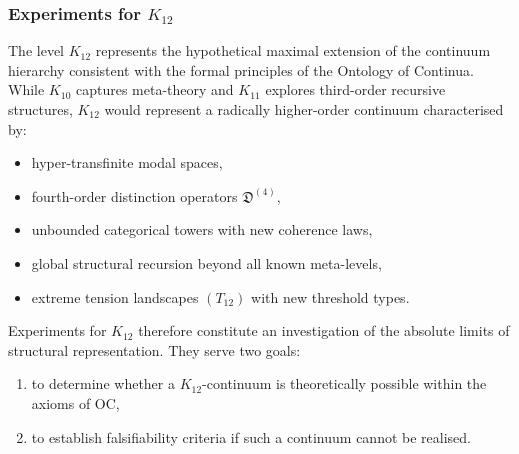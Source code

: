 
\subsubsection{Experiments for $K_{12}$}
\label{sec:experiments-k12}

The level $K_{12}$ represents the hypothetical maximal extension of 
the continuum hierarchy consistent with the formal principles of the 
Ontology of Continua.  
While $K_{10}$ captures meta-theory and $K_{11}$ explores 
third-order recursive structures, $K_{12}$ would represent a 
radically higher-order continuum characterised by:

\begin{itemize}
    \item hyper-transfinite modal spaces,
    \item fourth-order distinction operators $\mathfrak{D}^{(4)}$,
    \item unbounded categorical towers with new coherence laws,
    \item global structural recursion beyond all known meta-levels,
    \item extreme tension landscapes $(T_{12})$ with new threshold types.
\end{itemize}

Experiments for $K_{12}$ therefore constitute an investigation of the 
absolute limits of structural representation.  
They serve two goals:

\begin{enumerate}
    \item to determine whether a $K_{12}$-continuum is theoretically 
          possible within the axioms of OC,
    \item to establish falsifiability criteria if such a continuum 
          cannot be realised.
\end{enumerate}



